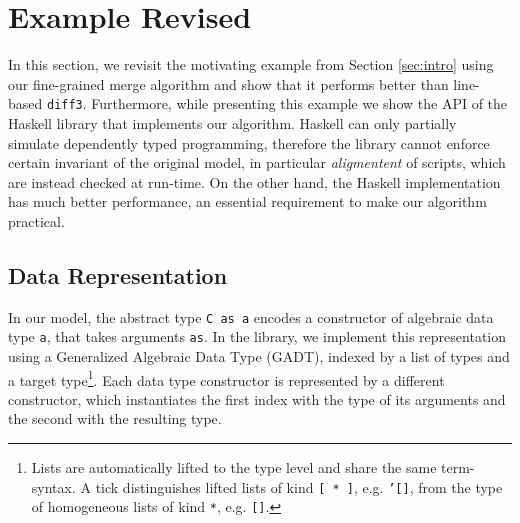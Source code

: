 \documentclass{sigplanconf}
\theoremstyle{plain}
\newtheorem{thm}{Theorem}
\begin{document}

\section{Example Revised}
\label{sec:haskell}
In this section, we revisit the motivating example from Section
\ref{sec:intro} using our fine-grained merge algorithm and show that
it performs better than line-based \texttt{diff3}.
%
Furthermore, while presenting this example we show the API of the
Haskell library that implements our algorithm.
%
Haskell can only partially simulate dependently typed programming,
therefore the library cannot enforce certain invariant of the
original model, in particular \emph{aligmentent} of scripts, which are
instead checked at run-time.
%
On the other hand, the Haskell implementation has much better
performance, an essential requirement to make our algorithm practical.
%

\subsection{Data  Representation}
In our model, the abstract type \texttt{C as a} encodes a constructor
of algebraic data type \texttt{a}, that takes arguments \texttt{as}.
%
In the library, we implement this representation using
a Generalized Algebraic Data Type (GADT), indexed by a list of types
and a target type\footnote{Lists are automatically lifted to the type
  level and share the same term-syntax. A tick distinguishes lifted
  lists of kind \texttt{[ * ]}, e.g. \texttt{'[]}, from the type of
  homogeneous lists of kind \texttt{*}, e.g. \texttt{[]}.}.
%
Each data type constructor is represented by a different constructor,
which instantiates the first index with the type of its arguments and
the second with the resulting type.
%
\end{document}
